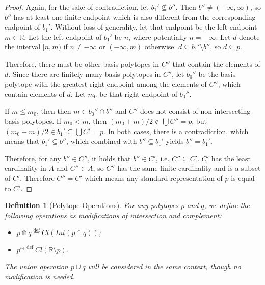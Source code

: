\documentclass{article}
\newtheorem*{definition}{Definition}
\newcommand{\R}{\mathbb{R}}
\newcommand{\bcup}{\cup}
\newcommand{\bcap}{\Cap}
\newcommand{\bstar}{^\circledast}
\newcommand{\eqdef}{\stackrel{\text{def}}{=}}
\begin{document}
\begin{proof}
  Again, for the sake of contradiction, let $b_1' \not \subseteq b''$. Then $b'' \neq (-\infty, \infty)$, so $b''$ has at least one finite endpoint which is also different from the corresponding endpoint of $b_1'$. Without loss of generality, let that endpoint be the left endpoint $m \in \R$. Let the left endpoint of $b_1'$ be $n$, where potentially $n = -\infty$. Let $d$ denote the interval $[n, m)$ if $n \neq -\infty$ or $(-\infty, m)$ otherwise. $d \subseteq b_1' \setminus b''$, so $d \subseteq p$.
\begin{figure}[ht]
    \centering
\end{figure}

    Therefore, there must be other basis polytopes in $C''$ that contain the elements of $d$. Since there are finitely many basis polytopes in $C''$, let $b_0''$ be the basis polytope with the greatest right endpoint among the elements of $C''$, which contain elements of $d$. Let $m_0$ be that right endpoint of $b_0''$.

    If $m \leq m_0$, then then $m \in b_0'' \cap b''$ and $C''$ does not consist of non-intersecting basis polytopes. If $m_0 < m$, then $(m_0 + m)/2 \not \in \bigcup C'' = p$, but $(m_0+m)/2 \in b_1' \subseteq \bigcup C' = p$. In both cases, there is a contradiction, which means that $b_1' \subseteq b''$, which combined with $b'' \subseteq b_1'$ yields $b'' = b_1'$.

  Therefore, for any $b'' \in C''$, it holds that $b'' \in C'$, i.e. $C'' \subseteq C'$. $C'$ has the least cardinality in $A$ and $C'' \in A$, so $C''$ has the same finite cardinality and is a subset of $C'$. Therefore $C'' = C'$ which means any standard representation of $p$ is equal to $C'$.
\end{proof}

\begin{definition}[Polytope Operations]
For any polytopes $p$ and $q$, we define the following operations as modifications of intersection and complement:
\begin{itemize}
  \item $p \bcap q \eqdef Cl(Int(p \cap q))$;
  \item $p \bstar \eqdef Cl(\R \setminus p) $.
\end{itemize}
The union operation $p \bcup q$ will be considered in the same context, though no modification is needed.
\end{definition}
\end{document}
